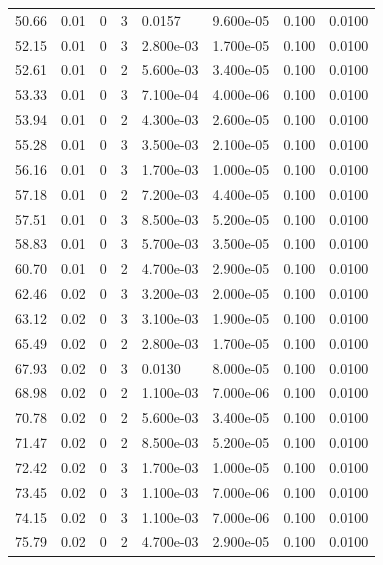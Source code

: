 \documentclass[preview]{standalone}
\begin{document}
{{{\begin{tabular}{L{1.2cm}C{1.2cm} C{0.3cm}C{0.5cm} C{1.4cm}C{1.4cm} C{1.4cm}C{1.4cm}}
  50.66  &  0.01  & 0     &  3 &  0.0157  & 9.600e-05  & 0.100 &  0.0100   \\ 
  52.15  &  0.01  & 0     &  3 &  2.800e-03  & 1.700e-05  & 0.100 &  0.0100   \\ 
  52.61  &  0.01  & 0     &  2 &  5.600e-03  & 3.400e-05  & 0.100 &  0.0100   \\ 
  53.33  &  0.01  & 0     &  3 &  7.100e-04  & 4.000e-06  & 0.100 &  0.0100   \\ 
  53.94  &  0.01  & 0     &  2 &  4.300e-03  & 2.600e-05  & 0.100 &  0.0100   \\ 
  55.28  &  0.01  & 0     &  3 &  3.500e-03  & 2.100e-05  & 0.100 &  0.0100   \\ 
  56.16  &  0.01  & 0     &  3 &  1.700e-03  & 1.000e-05  & 0.100 &  0.0100   \\ 
  57.18  &  0.01  & 0     &  2 &  7.200e-03  & 4.400e-05  & 0.100 &  0.0100   \\ 
  57.51  &  0.01  & 0     &  3 &  8.500e-03  & 5.200e-05  & 0.100 &  0.0100   \\ 
  58.83  &  0.01  & 0     &  3 &  5.700e-03  & 3.500e-05  & 0.100 &  0.0100   \\ 
  60.70  &  0.01  & 0     &  2 &  4.700e-03  & 2.900e-05  & 0.100 &  0.0100   \\ 
  62.46  &  0.02  & 0     &  3 &  3.200e-03  & 2.000e-05  & 0.100 &  0.0100   \\ 
  63.12  &  0.02  & 0     &  3 &  3.100e-03  & 1.900e-05  & 0.100 &  0.0100   \\ 
  65.49  &  0.02  & 0     &  2 &  2.800e-03  & 1.700e-05  & 0.100 &  0.0100   \\ 
  67.93  &  0.02  & 0     &  3 &  0.0130  & 8.000e-05  & 0.100 &  0.0100   \\ 
  68.98  &  0.02  & 0     &  2 &  1.100e-03  & 7.000e-06  & 0.100 &  0.0100   \\ 
  70.78  &  0.02  & 0     &  2 &  5.600e-03  & 3.400e-05  & 0.100 &  0.0100   \\ 
  71.47  &  0.02  & 0     &  2 &  8.500e-03  & 5.200e-05  & 0.100 &  0.0100   \\ 
  72.42  &  0.02  & 0     &  3 &  1.700e-03  & 1.000e-05  & 0.100 &  0.0100   \\ 
  73.45  &  0.02  & 0     &  3 &  1.100e-03  & 7.000e-06  & 0.100 &  0.0100   \\ 
  74.15  &  0.02  & 0     &  3 &  1.100e-03  & 7.000e-06  & 0.100 &  0.0100   \\ 
  75.79  &  0.02  & 0     &  2 &  4.700e-03  & 2.900e-05  & 0.100 &  0.0100   \\ 

\end{tabular}}}}
\end{document}
